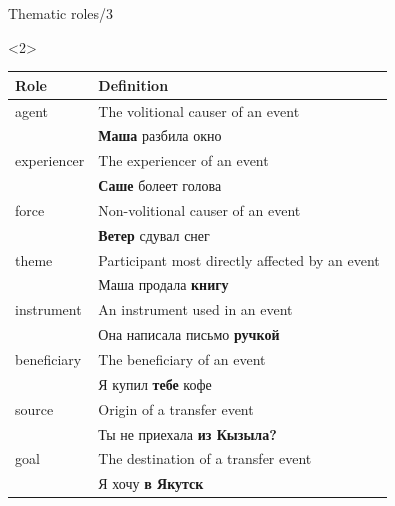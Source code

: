 \documentclass[10pt, compress]{beamer}
\begin{document}
\begin{frame}{Thematic roles/3}
\begin{onlyenv}<2>
\begin{center}
\begin{small}
\begin{tabular}{ll}
  \textbf{Role} & \textbf{Definition} \\
 \hline
  {\sc agent}  & The volitional causer of an event \\
               & \textbf{Маша} разбила окно \\
  {\sc experiencer} & The experiencer of an event  \\
                    & \textbf{Саше} болеет голова \\
  {\sc force} & Non-volitional causer of an event  \\
              & \textbf{Ветер} сдувал снег \\ 
  {\sc theme} & Participant most directly affected by an event  \\
              & Маша продала \textbf{книгу} \\
  {\sc instrument} & An instrument used in an event \\
                 & Она написала письмо \textbf{ручкой} \\
  {\sc beneficiary} & The beneficiary of an event \\
                 & Я купил \textbf{тебе} кофе \\
  {\sc source} & Origin of a transfer event \\
              & Ты не приехала \textbf{из Кызыла?} \\
  {\sc goal} & The destination of a transfer event \\
               & Я хочу \textbf{в Якутск} \\
 \hline
\end{tabular} 
\end{small}
\end{center}
\end{onlyenv}

\end{frame}
\end{document}
